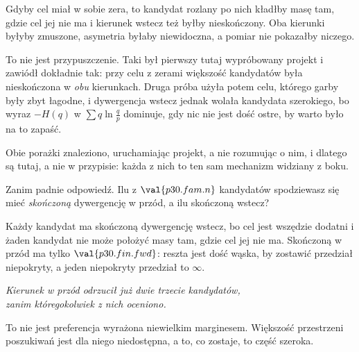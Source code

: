 \begin{fr}

Gdyby cel miał w sobie zera, to kandydat rozlany po nich kładłby masę tam,
gdzie cel jej nie ma \dash{} i kierunek wstecz też byłby nieskończony. Oba
kierunki byłyby zmuszone, asymetria byłaby niewidoczna, a pomiar nie
pokazałby niczego.

\begin{note}
To nie jest przypuszczenie. Taki był pierwszy tutaj wypróbowany projekt i
zawiódł dokładnie tak: przy celu z zerami większość kandydatów była
nieskończona w \emph{obu} kierunkach. Druga próba użyła potem celu, którego
garby były zbyt łagodne, i dywergencja wstecz jednak wolała kandydata
szerokiego, bo wyraz $-H(q)$ w $\sum q \ln \frac{q}{p}$ dominuje, gdy nic
nie jest dość ostre, by warto było na to zapaść.

Obie porażki znaleziono, uruchamiając projekt, a nie rozumując o nim, i
dlatego są tutaj, a nie w przypisie: każda z nich to ten sam mechanizm
widziany z boku.
\end{note}
\end{fr}

\begin{fr}
Zanim padnie odpowiedź. Ilu z $\val{p30.fam.n}$ kandydatów spodziewasz się
mieć \emph{skończoną} dywergencję w przód, a ilu skończoną wstecz?
\dotline
\nextframe
\end{fr}

\begin{fr}

Każdy kandydat ma skończoną dywergencję wstecz, bo cel jest wszędzie dodatni
i żaden kandydat nie może położyć masy tam, gdzie cel jej nie ma. Skończoną
w przód ma tylko $\val{p30.fin.fwd}$: reszta jest dość wąska, by zostawić
przedział niepokryty, a jeden niepokryty przedział to $\infty$.

\begin{center}
\emph{Kierunek w przód odrzucił już dwie trzecie kandydatów,\\
zanim któregokolwiek z nich oceniono.}
\end{center}

To nie jest preferencja wyrażona niewielkim marginesem. Większość przestrzeni
poszukiwań jest dla niego niedostępna, a to, co zostaje, to część
szeroka.
\end{fr}

